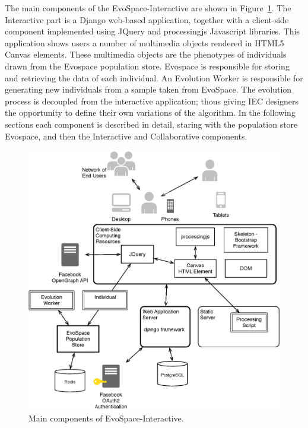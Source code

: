 \documentclass{sig-alternate}
\begin{document}
The main components of the EvoSpace-Interactive are shown in Figure~\ref{fig:arch}. The Interactive part is a Django \cite{} web-based application, together with a client-side component implemented using JQuery and processingjs Javascript libraries. This application shows users a number of multimedia objects rendered in HTML5 Canvas elements. These multimedia objects are the phenotypes of individuals drawn from the Evospace population store. Evospace is responsible for storing and retrieving the data of each individual. An Evolution Worker is responsible for generating new individuals from a sample taken from EvoSpace. The evolution process is decoupled from the interactive application; thous giving IEC designers the opportunity to define their own variations of the algorithm. In the following sections each component is described in detail, staring with the population store Evospace, and then the Interactive and Collaborative components.     

\begin{figure}[!t]
    \centering
        \includegraphics[width=4.5in]{Architecture.eps}
    \caption{Main components of EvoSpace-Interactive.}
    \label{fig:arch}
\end{figure}
\end{document}
